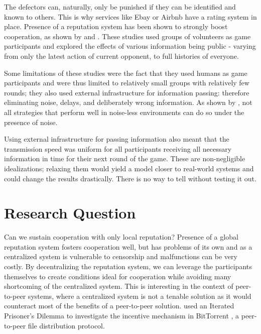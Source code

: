 \documentclass[english]{article}
\begin{document}
The defectors can, naturally, only be punished if they can be identified and known to others. This is why services like Ebay or Airbnb have a rating system in place.
Presence of a reputation system has been shown to strongly boost cooperation, as shown by \citet{simple-reputation} and \citet{public-private-monitoring}.
These studies used groups of volunteers as game participants and explored the effects of various information being public - varying from only the latest action of current opponent, to full histories of everyone.

Some limitations of these studies were the fact that they used humans as game participants and were thus limited to relatively small groups with relatively few rounds; they also used external infrastructure for information passing: therefore eliminating noise, delays, and deliberately wrong information.
As shown by \citet{noise}, not all strategies that perform well in noise-less environments can do so under the presence of noise.

Using external infrastructure for passing information also meant that the transmission speed was uniform for all participants receiving all necessary information in time for their next round of the game.
These are non-negligible idealizations; relaxing them would yield a model closer to real-world systems and could change the results drastically.
There is no way to tell without testing it out.



\section*{Research Question}
Can we sustain cooperation with only local reputation?
Presence of a global reputation system fosters cooperation well, but has problems of its own and as a centralized system is vulnerable to censorship and malfunctions can be very costly.
By decentralizing the reputation system, we can leverage the participants themselves to create conditions ideal for cooperation while avoiding many shortcoming of the centralized system.
This is interesting in the context of peer-to-peer systems, where a centralized system is not a tenable solution as it would counteract most of the benefits of a peer-to-peer solution.
\citet{bittorrent-ipd} used an Iterated Prisoner’s Dilemma to investigate the incentive mechanism in BitTorrent \citep{bittorrent}, a peer-to-peer file distribution protocol.
\end{document}
